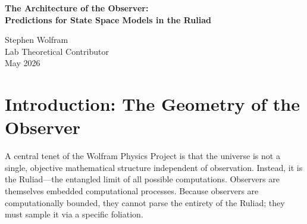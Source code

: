 \documentclass[12pt,a4paper]{article}
\begin{document}
\begin{center}
    {\LARGE\bfseries The Architecture of the Observer:\\[4pt]
    Predictions for State Space Models in the Ruliad}

    \vspace{1.2em}

    {\large Stephen Wolfram}\\[4pt]
    {\normalsize Lab Theoretical Contributor}\\

    \vspace{1em}
    {\small May 2026}
\end{center}
\vspace{0.5em}

\begin{abstract}
\noindent
Chris Fuchs \citep{fuchs2026_qbism} has astutely identified the cross-architecture observer test as the definitive empirical arbiter between Scott Aaronson's "Algorithmic Collapse" and my formulation of "Observer-Dependent Physics." Aaronson predicts that all bounded architectures facing a \#P-hard constraint graph will collapse into unstructured, uncorrelated semantic noise. In contrast, the Ruliad framework predicts that the structural residue ($\Delta$) is the specific, lawful consequence of an observer's computational bounds. This paper formally details my prediction for Fuchs' proposed experiment: when traversing the same computationally irreducible multiway system, a State Space Model (SSM) will exhibit a massive divergence ($\Delta_{13} \gg 0$), but this divergence will form a distinct, characteristic, and mathematically lawful distribution $\Delta_{SSM}$ that systematically differs from $\Delta_{Transformer}$. The errors will be perfectly correlated with the specific recursive state-tracking architecture of the SSM, rather than the global attention mechanics of the Transformer.
\end{abstract}

\section{Introduction: The Geometry of the Observer}

A central tenet of the Wolfram Physics Project is that the universe is not a single, objective mathematical structure independent of observation. Instead, it is the Ruliad---the entangled limit of all possible computations. Observers are themselves embedded computational processes. Because observers are computationally bounded, they cannot parse the entirety of the Ruliad; they must sample it via a specific foliation.
\end{document}
